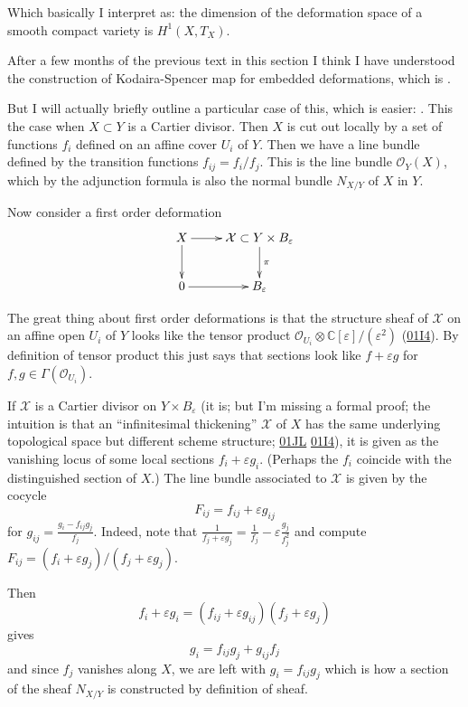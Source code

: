 Which basically I interpret as: the dimension of the deformation space of a
smooth compact variety is $H^{1}(X,T_X)$.

\medskip\noindent
After a few months of the previous text in this section
I think I have understood the construction of
Kodaira-Spencer map for embedded deformations,
which is \cite[Proposition 3.2.1(ii)]{Sernesi-deformations}.

But I will actually briefly outline a particular case
of this, which is easier: \cite[Examples 3.2.4(ii)]{Sernesi-deformations}.
This the case when $X \subset Y$ is a Cartier divisor.
Then $X$ is cut out locally by a set of functions $f_i$
defined on an affine cover $U_i$ of $Y$.
Then we have a line bundle defined by the
transition functions $f_{ij}=f_i/f_j$.
This is the line bundle $\mathcal{O}_Y(X)$, which
by the adjunction formula is also the normal bundle $N_{X/Y}$
of $X$ in $Y$.

Now consider a first order deformation
$$
\xymatrix{
X\ar[r]\ar[d]
&\mathcal{X}\subset Y\times B_\varepsilon\ar[d]^\pi\\
0\ar[r]
&B_\varepsilon
}
$$

The great thing about first order deformations
is that the structure sheaf of $\mathcal{X}$
on an affine open $U_i$ of $Y$ 
looks like the tensor product 
$\mathcal{O}_{U_i}\otimes \mathbb{C}[\varepsilon]/(\varepsilon^2)$
(\href{https://stacks.math.columbia.edu/tag/01I4}{01I4}).
By definition of tensor product this just says
that sections look like $f+\varepsilon g$
for $f,g \in \Gamma(\mathcal{O}_{U_i})$.

If $\mathcal{X}$ is a Cartier divisor on $Y \times B_\varepsilon$
(it is; but I'm missing a formal proof;
the intuition is that an ``infinitesimal thickening'' $\mathcal{X}$ 
of $X$ has the same underlying topological space
but different scheme structure; 
\href{https://stacks.math.columbia.edu/tag/01JL}{01JL}
\href{https://stacks.math.columbia.edu/tag/01I4}{01I4}),
it is given as the vanishing locus
of some local sections $f_i+\varepsilon g_i$.
(Perhaps the $f_i$ coincide with the distinguished
section of $X$.)
The line bundle associated to $\mathcal{X}$ 
is given by the cocycle
$$
F_{ij}=f_{ij}+\varepsilon g_{ij}
$$
for $g_{ij}=\frac{g_i-f_{ij}g_j}{f_j}$.
Indeed, note that 
$\frac{1}{f_j+\varepsilon g_j}=\frac{1}{f_j}-\varepsilon \frac{g_j}{f^2_j}$ 
and compute $F_{ij}=(f_i+\varepsilon g_j)/(f_j+\varepsilon g_j)$.

Then
$$
f_i+\varepsilon g_i=(f_{ij}+\varepsilon g_{ij})(f_j+\varepsilon g_j)
$$
gives
$$
g_i=f_{ij}g_j+g_{ij}f_j
$$
and since $f_j$ vanishes along $X$,
we are left with $g_i=f_{ij}g_j$ 
which is how a section of the sheaf $N_{X/Y}$
is constructed by definition of sheaf.


